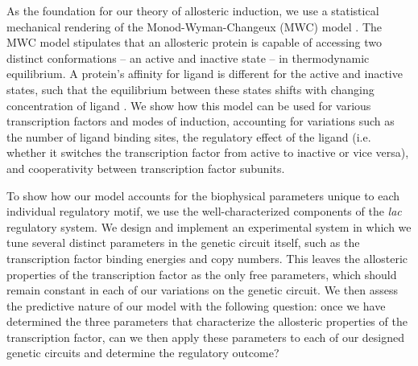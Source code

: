 As the foundation for our theory of allosteric induction, we use a statistical mechanical rendering of the Monod-Wyman-Changeux (MWC) model \cite{MONOD1965}. The MWC model stipulates that an allosteric protein is capable of
accessing two distinct conformations -- an active and
inactive state -- in thermodynamic equilibrium. A protein's affinity
for ligand is different for the active and inactive states, such that the
equilibrium between these states shifts with changing concentration of ligand
\cite{Marzen2013}. We show how this model can be used for various transcription factors and modes of induction, accounting for variations such as the number of ligand binding sites, the regulatory effect of the ligand (i.e. whether it switches the transcription factor from active to inactive or vice versa), and cooperativity between transcription factor subunits. 


To show how our model accounts for the biophysical parameters unique to each individual regulatory motif, we use the well-characterized components of the \textit{lac} regulatory system. We design and implement an experimental system in which we tune several distinct parameters in the genetic circuit itself, such as the transcription factor binding energies and copy numbers. This leaves the allosteric properties of the transcription factor as the only free parameters, which should remain constant in each of our variations on the genetic circuit. We then assess the predictive nature of our model with the following question: once we have determined the three parameters that characterize the allosteric properties of the transcription factor, can we then apply these parameters to each of our designed genetic circuits and determine the regulatory outcome?



